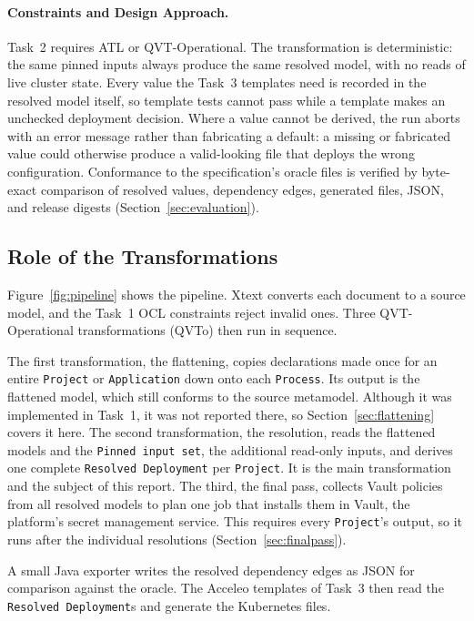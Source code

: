 \paragraph{Constraints and Design Approach.} Task~2 requires ATL or
QVT-Operational. The transformation is deterministic: the same
pinned inputs always produce the same resolved model, with no reads of live
cluster state. Every value the Task~3 templates need is recorded in the
resolved model itself, so template tests cannot pass while a template makes an
unchecked deployment decision. Where a value cannot be derived, the run aborts
with an error message rather than fabricating a default: a missing or
fabricated value could otherwise produce a valid-looking file that deploys
the wrong configuration. Conformance to the specification's oracle files is
verified by byte-exact comparison of resolved values, dependency edges,
generated files, JSON, and release digests (Section~\ref{sec:evaluation}).

\subsection{Role of the Transformations}
\label{sec:role}

Figure~\ref{fig:pipeline} shows the pipeline. Xtext converts each document
to a source model, and the Task~1 OCL constraints reject invalid ones. Three
QVT-Operational transformations (QVTo) then run in sequence.

The first transformation, the flattening, copies declarations made once for an
entire \texttt{Project} or \texttt{Application} down onto each \texttt{Process}.
Its output is the flattened model, which still conforms to the
source metamodel. Although it was implemented in Task~1, it was not reported
there, so Section~\ref{sec:flattening} covers it here. The second
transformation, the resolution, reads the flattened models and the
\texttt{Pinned input set}, the additional read-only inputs, and derives
one complete \texttt{Resolved Deployment} per
\texttt{Project}. It is the main transformation and the subject of this
report. The third, the final pass, collects Vault policies from all resolved
models to plan one job that installs them in Vault, the platform's secret
management service. This requires every \texttt{Project}'s
output, so it runs after the individual resolutions (Section~\ref{sec:finalpass}).

A small Java exporter writes the resolved dependency edges as JSON for
comparison against the oracle. The Acceleo templates of Task~3 then read the
\texttt{Resolved Deployment}s and generate the Kubernetes files.

